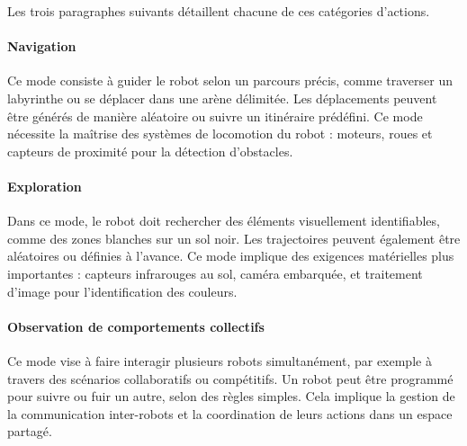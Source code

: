 Les trois paragraphes suivants détaillent chacune de ces catégories d'actions.

\paragraph{Navigation}
Ce mode consiste à guider le robot selon un parcours précis, comme traverser un labyrinthe ou se déplacer dans une arène délimitée.
Les déplacements peuvent être générés de manière aléatoire ou suivre un itinéraire prédéfini.
Ce mode nécessite la maîtrise des systèmes de locomotion du robot : moteurs, roues et capteurs de proximité pour la détection d’obstacles.

\paragraph{Exploration}
Dans ce mode, le robot doit rechercher des éléments visuellement identifiables, comme des zones blanches sur un sol noir.
Les trajectoires peuvent également être aléatoires ou définies à l’avance.
Ce mode implique des exigences matérielles plus importantes : capteurs infrarouges au sol, caméra embarquée, et traitement d’image pour l’identification des couleurs.

\paragraph{Observation de comportements collectifs}
Ce mode vise à faire interagir plusieurs robots simultanément, par exemple à travers des scénarios collaboratifs ou compétitifs.
Un robot peut être programmé pour suivre ou fuir un autre, selon des règles simples.
Cela implique la gestion de la communication inter-robots et la coordination de leurs actions dans un espace partagé.
